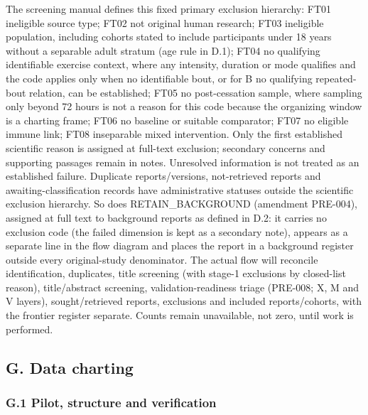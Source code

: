 \documentclass[
  11pt,
  a4paper,
]{article}
\begin{document}
The screening manual defines this fixed primary exclusion hierarchy:
FT01 ineligible source type; FT02 not original human research; FT03
ineligible population, including cohorts stated to include participants
under 18 years without a separable adult stratum (age rule in D.1); FT04
no qualifying identifiable exercise context, where any intensity,
duration or mode qualifies and the code applies only when no
identifiable bout, or for B no qualifying repeated-bout relation, can be
established; FT05 no post-cessation sample, where sampling only beyond
72 hours is not a reason for this code because the organizing window is
a charting frame; FT06 no baseline or suitable comparator; FT07 no
eligible immune link; FT08 inseparable mixed intervention. Only the
first established scientific reason is assigned at full-text exclusion;
secondary concerns and supporting passages remain in notes. Unresolved
information is not treated as an established failure. Duplicate
reports/versions, not-retrieved reports and awaiting-classification
records have administrative statuses outside the scientific exclusion
hierarchy. So does RETAIN\_BACKGROUND (amendment PRE-004), assigned at
full text to background reports as defined in D.2: it carries no
exclusion code (the failed dimension is kept as a secondary note),
appears as a separate line in the flow diagram and places the report in
a background register outside every original-study denominator. The
actual flow will reconcile identification, duplicates, title screening
(with stage-1 exclusions by closed-list reason), title/abstract
screening, validation-readiness triage (PRE-008; X, M and V layers),
sought/retrieved reports, exclusions and included reports/cohorts, with
the frontier register separate. Counts remain unavailable, not zero,
until work is performed.

\subsection{G. Data charting}\label{g.-data-charting}

\subsubsection{G.1 Pilot, structure and
verification}\label{g.1-pilot-structure-and-verification}
\end{document}
